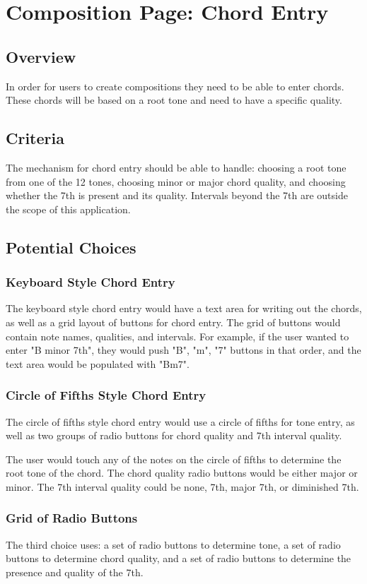 \documentclass[onecolumn, draftclsnofoot,10pt, compsoc]{IEEEtran}
\begin{document}

\section{Composition Page: Chord Entry}
\subsection{Overview}
In order for users to create compositions they need to be able to enter chords. 
These chords will be based on a root tone and need to have a specific quality. 
\subsection{Criteria}
The mechanism for chord entry should be able to handle: choosing a root tone from one of the 12 tones, choosing minor or major chord quality, and choosing whether the 7th is present and its quality. 
Intervals beyond the 7th are outside the scope of this application. 
\subsection{Potential Choices}
\subsubsection{Keyboard Style Chord Entry}
The keyboard style chord entry would have a text area for writing out the chords, as well as a grid layout of buttons for chord entry. 
The grid of buttons would contain note names, qualities, and intervals. 
For example, if the user wanted to enter "B minor 7th", they would push "B", "m", "7" buttons in that order, and the text area would be populated with "Bm7". 
\subsubsection{Circle of Fifths Style Chord Entry}
The circle of fifths style chord entry would use a circle of fifths for tone entry, as well as two groups of radio buttons for chord quality and 7th interval quality.

The user would touch any of the notes on the circle of fifths to determine the root tone of the chord. 
The chord quality radio buttons would be either major or minor. 
The 7th interval quality could be none, 7th, major 7th, or diminished 7th. 
\subsubsection{Grid of Radio Buttons}
The third choice uses: a set of radio buttons to determine tone, a set of radio buttons to determine chord quality, and a set of radio buttons to determine the presence and quality of the 7th. 
\end{document}
